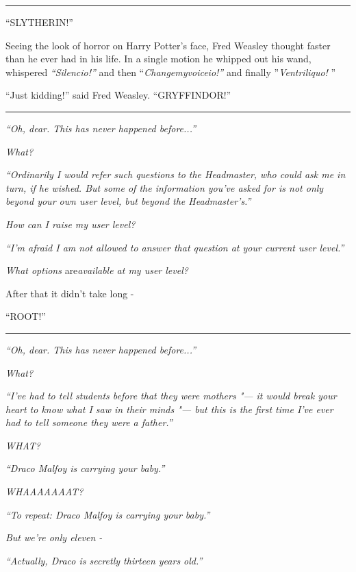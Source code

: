 \begin{center}\rule{3in}{0.4pt}\end{center}

``SLYTHERIN!''

Seeing the look of horror on Harry Potter's face, Fred Weasley thought
faster than he ever had in his life. In a single motion he whipped out
his wand, whispered \emph{``Silencio!''} and then
``\emph{Changemyvoiceio!''} and finally ''\emph{Ventriliquo!} ''

``Just kidding!'' said Fred Weasley. ``GRYFFINDOR!''

\begin{center}\rule{3in}{0.4pt}\end{center}

\emph{``Oh, dear. This has never happened before...''}

\emph{What?}

\emph{``Ordinarily I would refer such questions to the Headmaster, who
could ask me in turn, if he wished. But some of the information you've
asked for is not only beyond your own user level, but beyond the
Headmaster's.''}

\emph{How can I raise my user level?}

\emph{``I'm afraid I am not allowed to answer that question at your
current user level.''}

\emph{What options} are\emph{available at my user level?}

After that it didn't take long -

``ROOT!''

\begin{center}\rule{3in}{0.4pt}\end{center}

\emph{``Oh, dear. This has never happened before...''}

\emph{What?}

\emph{``I've had to tell students before that they were mothers "--- it
would break your heart to know what I saw in their minds "--- but this is
the first time I've ever had to tell someone they were a father.''}

\emph{WHAT?}

\emph{``Draco Malfoy is carrying your baby.''}

\emph{WHAAAAAAAT?}

\emph{``To repeat: Draco Malfoy is carrying your baby.''}

\emph{But we're only eleven -}

\emph{``Actually, Draco is secretly thirteen years old.''}

